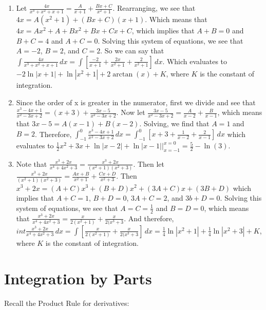 \begin{Answer}[ref=partfrac]
\begin{enumerate}
\item Let $\frac{4x}{x^3 + x^2 + x + 1} = \frac{A}{x + 1} + \frac{Bx + C}{x^2 
+ 1}$. Rearranging, we see that $4x = A(x^2 + 1) + (Bx + C)(x + 1)$. Which 
means that $4x = Ax^2 + A + Bx^2 + Bx + Cx + C$, which implies that $A + B = 
0$ and $B + C = 4$ and $A + C = 0$. Solving this system of equations, we see 
that $A = -2$, $B = 2$, and $C = 2$. So we can say that $\int \frac{4x}{x^3 + 
x^2 + x + 1}\,dx = \int \left[ \frac{-2}{x + 1} + \frac{2x}{x^2 + 1} + \frac{2
}{x^2 + 1} \right]\,dx$. Which evaluates to $-2\ln{|x + 1|} + \ln{|x^2 + 1|} 
+ 2\arctan{(x)} + K$, where $K$ is the constant of integration.  
\item Since the order of x is greater in the numerator, first we divide and 
see that $\frac{x^3 - 4x + 1}{x^2 - 3x + 2} = (x + 3) + \frac{3x - 5}{x^2 - 3x 
+ 2}$. Now let $\frac{3x-5}{x^2 - 3x + 2} = \frac{A}{x-2} + \frac{B}{x - 1}$, 
which means that $3x - 5 = A(x - 1) + B(x - 2)$. Solving, we find that $A = 1$ 
and $B = 2$. Therefore, $\int_{-1}^0 \frac{x^3 - 4x + 1}{x^2 - 3x + 2}\,dx = 
\int_{-1}^0 \left[ x + 3 + \frac{1}{x-2} + \frac{2}{x-1} \right]\,dx$ which 
evaluates to $\frac{1}{2}x^2 + 3x + \ln{|x - 2|} + \ln{|x - 1|}|_{x = -1}^{x = 
0} = \frac{5}{2} - \ln{(3)}$. 
\item Note that $\frac{x^3 + 2x}{x^4 + 4x^2 + 3} = \frac{x^3 + 2x}{(x^2 + 1)(x^
2 + 3)}$. Then let $\frac{x^3 + 2x}{(x^2 + 1)(x^2 + 3)} = \frac{Ax + B}{x^2 + 1
} + \frac{Cx + D}{x^2 + 3}$. Then $x^3 + 2x = (A + C)x^3 + (B + D)x^2 + (3A + C
)x + (3B + D)$ which implies that $A + C = 1$, $B + D = 0$, $3A + C = 2$, and $
3b + D = 0$. Solving this system of equations, we see that $A = C = \frac{1}{2}
$ and $B = D = 0$, which means that $\frac{x^3 + 2x}{x^4 + 4x^2 + 3} = \frac{x
}{2(x^2 + 1)} + \frac{x}{2(x^3 + 3}$. And therefore, $int \frac{x^3 + 2x}{x^4 
+ 4x^2 + 3}\,dx = \int \left[ \frac{x}{2(x^2 + 1)} + \frac{x}{2(x^3 + 3} 
\right]\,dx = \frac{1}{4}\ln{|x^2 + 1|} + \frac{1}{4}\ln{|x^2 + 3|} + K$, 
where $K$ is the constant of integration. 
\end{enumerate}
\end{Answer}

\section{Integration by Parts}

Recall the Product Rule for derivatives:

